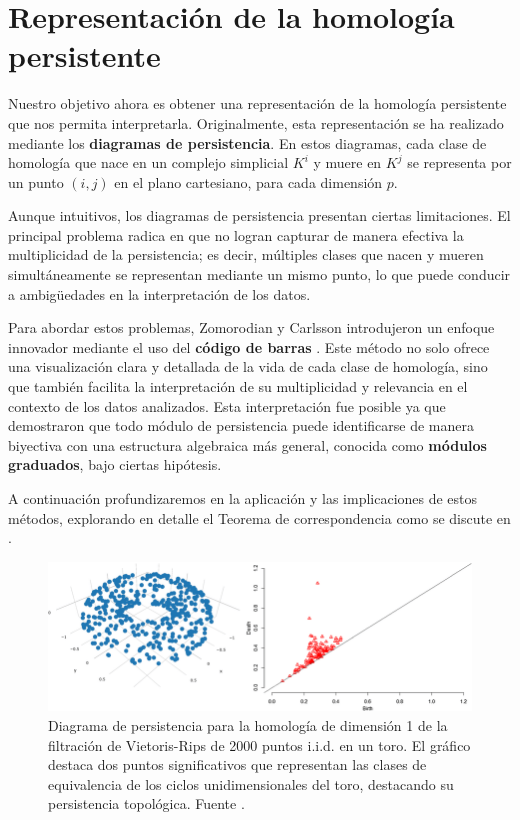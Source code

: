 \section{Representación de la homología persistente}

Nuestro objetivo ahora es obtener una representación de la homología persistente que nos permita interpretarla. Originalmente, esta representación se ha realizado mediante los \textbf{diagramas de persistencia}. En estos diagramas, cada clase de homología que nace en un complejo simplicial \(K^{i}\) y muere en \(K^{j}\) se representa por un punto \((i, j)\) en el plano cartesiano, para cada dimensión \(p\).

Aunque intuitivos, los diagramas de persistencia presentan ciertas limitaciones. El principal problema radica en que no logran capturar de manera efectiva la multiplicidad de la persistencia; es decir, múltiples clases que nacen y mueren simultáneamente se representan mediante un mismo punto, lo que puede conducir a ambigüedades en la interpretación de los datos.

Para abordar estos problemas, Zomorodian y Carlsson introdujeron un enfoque innovador mediante el uso del \textbf{código de barras} \cite{zomorodian2004computing}. Este método no solo ofrece una visualización clara y detallada de la vida de cada clase de homología, sino que también facilita la interpretación de su multiplicidad y relevancia en el contexto de los datos analizados. Esta interpretación fue posible ya que demostraron que todo módulo de persistencia puede identificarse de manera biyectiva con una estructura algebraica más general, conocida como \textbf{módulos graduados}, bajo ciertas hipótesis.

A continuación profundizaremos en la aplicación y las implicaciones de estos métodos, explorando en detalle el Teorema de correspondencia como se discute en \cite{Corbet_2018}.

\begin{figure}
	\centering
	\includegraphics[width=\textwidth]{img/persistence-diagram.png}
	\caption{Diagrama de persistencia para la homología de dimensión 1 de la filtración de Vietoris-Rips de 2000 puntos i.i.d. en un toro. El gráfico destaca dos puntos significativos que representan las clases de equivalencia de los ciclos unidimensionales del toro, destacando su persistencia topológica. Fuente \cite{divol2019}.}
\end{figure}


